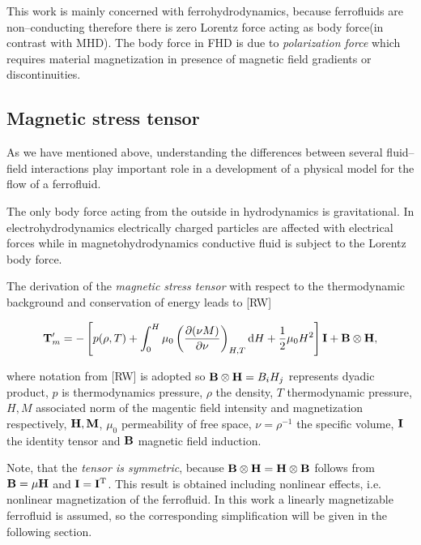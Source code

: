 \par This work is mainly concerned with ferrohydrodynamics, because ferrofluids are non--conducting therefore there is zero Lorentz force acting as body force(in contrast with MHD). The body force in FHD is due to \emph{polarization force} which requires material magnetization in presence of magnetic field gradients or discontinuities. 

\subsection{Magnetic stress tensor}

\par As we have mentioned above, understanding the differences between several fluid--field interactions play important role in a development of a physical model for the flow of a ferrofluid. 

The only body force acting from the outside in hydrodynamics is gravitational. In electrohydrodynamics electrically charged particles are affected with electrical forces while in magnetohydrodynamics conductive fluid is subject to the Lorentz body force.

\par The derivation of the \emph{magnetic stress tensor} with respect to the thermodynamic background and conservation of energy leads to [RW]

\begin{equation}
\mathbf{T}_m' = - \left[ p(\rho, T) + \int_0^H \mu_0 \left( \frac{\partial(\nu M)}{\partial \nu} \right)_{H, T} \mathrm{d}H + \frac{1}{2} \mu_0 H^2  \right] \mathbf{I} + \mathbf{B} \otimes \mathbf{H},
\label{eq:magnetic_stress_tensor}
\end{equation}

where notation from [RW] is adopted so $\mathbf{B} \otimes \mathbf{H} = B_i H_j$ represents dyadic product, $p$ is thermodynamics pressure, $\rho$ the density, $T$ thermodynamic pressure, $H, M$ associated norm of the magentic field intensity and magnetization respectively, $\mathbf{H}, \mathbf{M}$, $\mu_0$ permeability of free space, $\nu = \rho^{-1}$ the specific volume, $\mathbf{I}$ the identity tensor and $\mathbf{B}$ magnetic field induction. 

Note, that the \emph{tensor is symmetric}, because $\mathbf{B} \otimes \mathbf{H} = \mathbf{H} \otimes \mathbf{B}$ follows from $\mathbf{B} = \mu \mathbf{H}$ and $\mathbf{I} = \mathbf{I}^{\mathrm{T}}$. This result is obtained including nonlinear effects, i.e. nonlinear magnetization of the ferrofluid. In this work a linearly magnetizable ferrofluid is assumed, so the corresponding simplification will be given in the following section.

